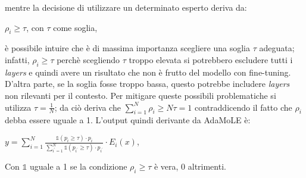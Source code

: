         mentre la decisione di utilizzare un determinato esperto deriva da:\\ \centerline{$\rho_i \geq \tau$, con $\tau$ come soglia,}\newline
        è possibile intuire che è di massima importanza scegliere una soglia $\tau$ adeguata; infatti, $\rho_i \geq \tau$ perchè scegliendo $\tau$ troppo elevata si potrebbero escludere tutti i \textit{layers} e quindi avere un risultato che non è frutto del modello con \gls{fine-tuning}.
        D'altra parte, se la soglia fosse troppo bassa, questo potrebbe includere \textit{layers} non rilevanti per il contesto.
        Per mitigare queste possibili problematiche si utilizza $\tau = \frac{1}{N}$; da ciò deriva che $\sum_{i=1}^N\rho_i \geq N\tau = 1$ contraddicendo il fatto che $\rho_i$ debba essere uguale a 1.
        L'output quindi derivante da AdaMoLE è:\\
        \centerline{$y=\sum_{i=1}^N \frac{\mathds{1}\left(p_i \geq \tau\right) \cdot p_i}{\sum_{i^{\prime}=1}^N \mathds{1}\left(p_{i^{\prime}} \geq \tau\right) \cdot p_{i^{\prime}}} \cdot E_i(x)$,}
        Con $\mathds{1}$ uguale a 1 se la condizione $\rho_i \geq \tau$ è vera, 0 altrimenti.

